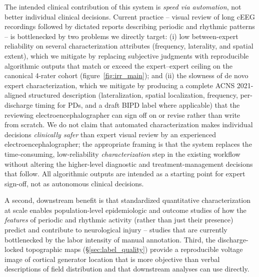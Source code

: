 \documentclass{iopjournal}
\begin{document}
The intended clinical contribution of this system is \emph{speed via automation}, not better individual clinical decisions. Current practice -- visual review of long cEEG recordings followed by dictated reports describing periodic and rhythmic patterns -- is bottlenecked by two problems we directly target: (i) low between-expert reliability on several characterization attributes (frequency, laterality, and spatial extent), which we mitigate by replacing subjective judgments with reproducible algorithmic outputs that match or exceed the expert--expert ceiling on the canonical 4-rater cohort (figure~\ref{fig:irr_main}); and (ii) the slowness of de novo expert characterization, which we mitigate by producing a complete ACNS 2021-aligned structured description (lateralization, spatial localization, frequency, per-discharge timing for PDs, and a draft BIPD label where applicable) that the reviewing electroencephalographer can sign off on or revise rather than write from scratch. We do not claim that automated characterization makes individual decisions \emph{clinically safer} than expert visual review by an experienced electroencephalographer; the appropriate framing is that the system replaces the time-consuming, low-reliability \emph{characterization} step in the existing workflow without altering the higher-level diagnostic and treatment-management decisions that follow. All algorithmic outputs are intended as a starting point for expert sign-off, not as autonomous clinical decisions.

A second, downstream benefit is that standardized quantitative characterization at scale enables population-level epidemiologic and outcome studies of how the \emph{features} of periodic and rhythmic activity (rather than just their presence) predict and contribute to neurological injury -- studies that are currently bottlenecked by the labor intensity of manual annotation. Third, the discharge-locked topographic maps (\S\ref{sec:label_quality}) provide a reproducible voltage image of cortical generator location that is more objective than verbal descriptions of field distribution and that downstream analyses can use directly.
\end{document}
